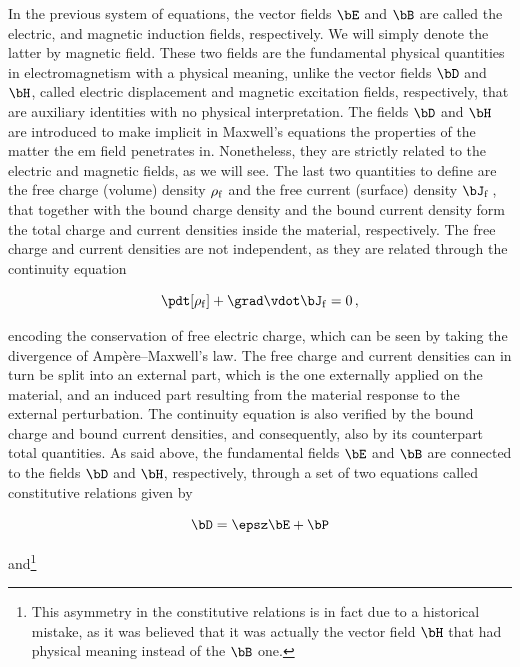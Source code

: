 \noindent In the previous system of equations, the vector fields $\bE$ and $\bB$ are called the electric, and magnetic induction fields, respectively.
We will simply denote the latter by magnetic field.
These two fields are the fundamental physical quantities in electromagnetism with a physical meaning, unlike the vector fields $\bD$ and $\bH$, called electric displacement and magnetic excitation fields, respectively, that are auxiliary identities with no physical interpretation.
The fields $\bD$ and $\bH$ are introduced to make implicit in Maxwell's equations the properties of the matter the \gls{em} field penetrates in.
Nonetheless, they are strictly related to the electric and magnetic fields, as we will see.
The last two quantities to define are the free charge (volume) density $\rho_{\mathrm{f}}$ and the free current (surface) density $\bJ_\f$\,, that together with the bound charge density and the bound current density form the total charge and current densities inside the material, respectively.
The free charge and current densities are not independent, as they are related through the continuity equation

\begin{equation}
\label{eq:continuity_equation}
    \pdt[\rho_\f] + \grad \vdot \bJ_\f = 0\,,
\end{equation}

\noindent encoding the conservation of free electric charge, which can be seen by taking the divergence of Amp\`ere--Maxwell's law.
The free charge and current densities can in turn be split into an external part, which is the one externally applied on the material, and an induced part resulting from the material response to the external perturbation.
The continuity equation is also verified by the bound charge and bound current densities, and consequently, also by its counterpart total quantities.
As said above, the fundamental fields $\bE$ and $\bB$ are connected to the fields $\bD$ and $\bH$, respectively, through a set of two equations called constitutive relations given by

\begin{equation}
    \label{eq:constitutive_relation_electric_field}
    \bD = \epsz \bE + \bP
\end{equation}

\noindent and\footnote{This asymmetry in the constitutive relations is in fact due to a historical mistake, as it was believed that it was actually the vector field $\bH$ that had physical meaning instead of the $\bB$ one.}

